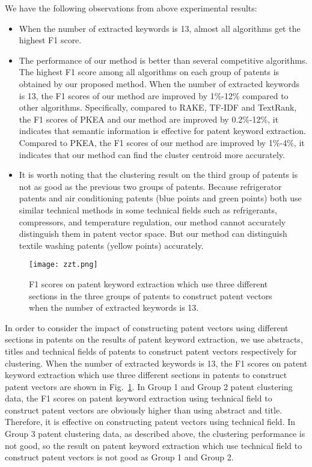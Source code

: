 \documentclass[conference]{IEEEtran}
\begin{document}
\begin{CJK}{UTF8}{gbsn}
	We have the following observations from above experimental results:
	\begin{itemize}
		\item When the number of extracted keywords is 13, almost all algorithms get the highest F1 score.
		\item The performance of our method is better than several competitive algorithms. The highest F1 score among all algorithms on each group of patents is obtained by our proposed method. When the number of extracted keywords is 13, the F1 scores of our method are improved by 1\%-12\% compared to other algorithms. Specifically, compared to RAKE, TF-IDF and TextRank, the F1 scores of PKEA and our method are improved by 0.2\%-12\%, it indicates that semantic information is effective for patent keyword extraction. Compared to PKEA, the F1 scores of our method are improved by 1\%-4\%, it indicates that our method can find the cluster centroid more accurately.
		\item It is worth noting that the clustering result on the third group of patents is not as good as the previous two groups of patents. Because refrigerator patents and air conditioning patents (blue points and green points) both use similar technical methods in some technical fields such as refrigerants, compressors, and temperature regulation, our method cannot accurately distinguish them in patent vector space. But our method can distinguish textile washing patents (yellow points) accurately.
	\end{itemize}
	\begin{figure}[ht]
		\centering
		\texttt{[image: zzt.png]} 
		\caption{F1 scores on patent keyword extraction which use three different sections in the three groups of patents to construct patent vectors when the number of extracted keywords is 13.}
		\label{zzt}
	\end{figure}
	
	In order to consider the impact of constructing patent vectors using different sections in patents on the results of patent keyword extraction, we use abstracts, titles and technical fields of patents to construct patent vectors respectively for clustering. When the number of extracted keywords is 13, the F1 scores on patent keyword extraction which use three different sections in patents to construct patent vectors are shown in Fig.~\ref{zzt}. In Group 1 and Group 2 patent clustering data, the F1 scores on patent keyword extraction using technical field to construct patent vectors are obviously higher than using abstract and title. Therefore, it is effective on constructing patent vectors using technical field. In Group 3 patent clustering data, as described above, the clustering performance is not good, so the result on patent keyword extraction which use technical field to construct patent vectors is not good as Group 1 and Group 2.
	

\end{CJK}
\end{document}
